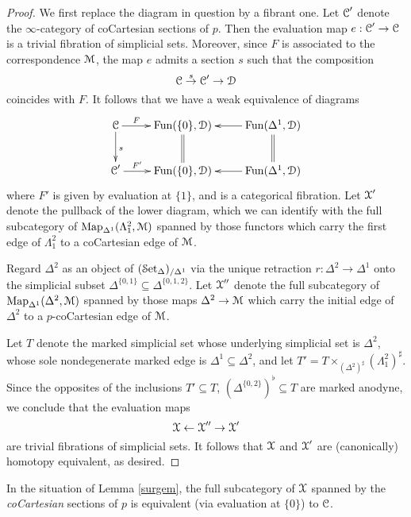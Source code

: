 \begin{proof}
We first replace the diagram in question by a fibrant one. Let $\operatorname{\mathcal{C}}'$ denote the
$\infty$-category of coCartesian sections of $p$. Then the evaluation map
$e: \operatorname{\mathcal{C}}' \rightarrow \operatorname{\mathcal{C}}$ is a trivial fibration of simplicial sets. Moreover, since $F$ is associated to the correspondence $\operatorname{\mathcal{M}}$, the map $e$ admits a section $s$ such that the composition
$$ \operatorname{\mathcal{C}} \stackrel{s}{\rightarrow} \operatorname{\mathcal{C}}' \rightarrow \operatorname{\mathcal{D}}$$
coincides with $F$. It follows that we have a weak equivalence of diagrams
$$ \xymatrix{ \calC \ar[r]^-{F} \ar[d]^{s} & \Fun( \{0\}, \calD) \ar@{=}[d] & \Fun(\Delta^1, \calD) \ar[l] \ar@{=}[d] \\
\calC' \ar[r]^-{F'} & \Fun( \{0\}, \calD) & \Fun(\Delta^1, \calD) \ar[l] }$$
where $F'$ is given by evaluation at $\{1\}$, and is a categorical fibration. Let
$\operatorname{\mathcal{X}}'$ denote the pullback of the lower diagram, which we can identify with 
the full subcategory of $\operatorname{{Map}}_{ \Delta^1}( \Lambda^2_1, \operatorname{\mathcal{M}} )$ spanned
by those functors which carry the first edge of $\Lambda^2_1$ to a coCartesian edge of $\operatorname{\mathcal{M}}$.

Regard $\Delta^2$ as an object of $(\operatorname{\mathcal{S}et_{\Delta}})_{/\Delta^1}$ via the unique retraction
$r: \Delta^2 \rightarrow \Delta^1$ onto the
simplicial subset $\Delta^{ \{0,1\} } \subseteq \Delta^{ \{0,1,2\} }$.
Let $\operatorname{\mathcal{X}}''$ denote the full subcategory of $\operatorname{{Map}}_{\Delta^1}(\Delta^2, \operatorname{\mathcal{M}})$
spanned by those maps $\Delta^2 \rightarrow \operatorname{\mathcal{M}}$ which carry the initial edge of $\Delta^2$ to a $p$-coCartesian edge of $\operatorname{\mathcal{M}}$. 

Let $T$ denote the marked simplicial set whose underlying simplicial set is $\Delta^2$, whose sole nondegenerate marked edge is $\Delta^1 \subseteq \Delta^2$, and let $T' = T \times_{ (\Delta^2)^{\sharp} } ( \Lambda^2_1)^{\sharp}$. Since the opposites of the inclusions
$T' \subseteq T$, $( \Delta^{ \{0,2\} } )^{\flat} \subseteq T$ are marked anodyne, we conclude that the evaluation maps
$$ \operatorname{\mathcal{X}} \leftarrow \operatorname{\mathcal{X}}'' \rightarrow \operatorname{\mathcal{X}}'$$ are trivial fibrations of simplicial sets.
It follows that $\operatorname{\mathcal{X}}$ and $\operatorname{\mathcal{X}}'$ are (canonically) homotopy equivalent, as desired.
\end{proof}

\begin{remark}
In the situation of Lemma \ref{surgem}, the full subcategory of $\operatorname{\mathcal{X}}$ spanned by the
{\em coCartesian} sections of $p$ is equivalent (via evaluation at $\{0\}$) to $\operatorname{\mathcal{C}}$.
\end{remark}

